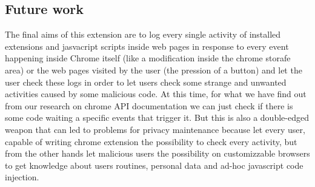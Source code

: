 \documentclass[12pt]{article}
\begin{document}
\begin{multicols}{2}
\subsection{Future work}
	The final aims of this extension are to log every single activity of installed extensions and jasvacript scripts
	inside web pages in response to every event happening inside Chrome itself (like a modification inside the chrome
	storafe area) or the web pages visited by the user (the pression of a button) and let the user check these logs 
	in order to let users check some strange and unwanted activities caused by some malicious code. At this time, 
	for what we have find out from our research on chrome API documentation we can just check if there is some code 
	waiting a specific events that trigger it.
	But this is also a double-edged weapon that can led to problems for privacy maintenance because let every user, capable of writing chrome extension the possibility to check every activity, but from the other hands let malicious users the possibility  on customizzable browsers to get knowledge about users routines, personal data and ad-hoc javascript code injection.
\end{multicols}
 
\end{document}
